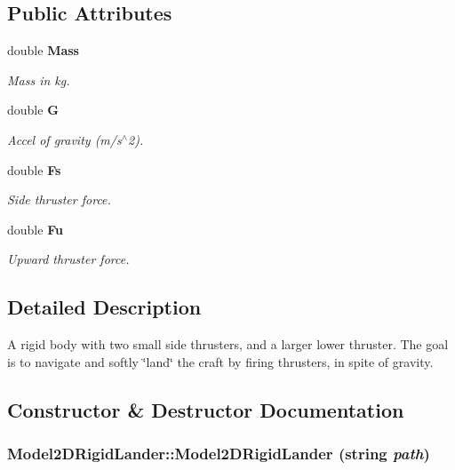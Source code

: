 \subsection*{Public Attributes}
\begin{CompactItemize}
\item 
double {\bf Mass}
\begin{CompactList}\small\item\em Mass in kg.\item\end{CompactList}\item 
double {\bf G}
\begin{CompactList}\small\item\em Accel of gravity (m/s$^\wedge$2).\item\end{CompactList}\item 
double {\bf Fs}
\begin{CompactList}\small\item\em Side thruster force.\item\end{CompactList}\item 
double {\bf Fu}
\begin{CompactList}\small\item\em Upward thruster force.\item\end{CompactList}\end{CompactItemize}


\subsection{Detailed Description}
A rigid body with two small side thrusters, and a larger lower thruster. The goal is to navigate and softly \char`\"{}land\char`\"{} the craft by firing thrusters, in spite of gravity.



\subsection{Constructor \& Destructor Documentation}
\subsubsection{\setlength{\rightskip}{0pt plus 5cm}Model2DRigid\-Lander::Model2DRigid\-Lander (string {\em path})}\label{classModel2DRigidLander_a0}



